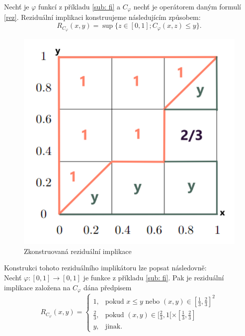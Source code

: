 \begin{example} Nech\v t je $\varphi$ funkcí z příkladu \ref{sub: fi} a $C_\varphi$ nech\v t je operátorem daným formulí \ref{rez}. Reziduální implikaci konstruujeme následujícím zp\r usobem: $$R_{C_\varphi}(x,y)=\sup\{z \in [0,1]; C_\varphi(x,z) \leq y\}.$$  


\begin{figure}[H]
    \caption{Zkonstruovaná reziduální implikace\\}
        \centering
        \includegraphics[scale=0.8]{template-fig/RPhi-impl.pdf}
\end{figure}

\end{example}

Konstrukci tohoto reziduálního implikátoru lze popsat následovn\v e:\\
    Nech\v t  $\varphi:[0,1]\rightarrow [0,1]$ je funkce z příkladu \ref{sub: fi}.
Pak je reziduální implikace zalo\v zena na $C_\varphi$ dána p\v redpisem
$$ R_{C_\varphi}(x,y) = \begin{cases} 1, & \mbox{pokud } x\leq y \mbox{ nebo } (x,y) \in [\frac{1}{3},\frac{2}{3}]^2\\
\frac{2}{3}, &\mbox {pokud }
(x,y)\in [\frac{2}{3},1[\times[\frac{1}{3},\frac{2}{3}]
\\ y, &\mbox {jinak.}
\end{cases} $$

